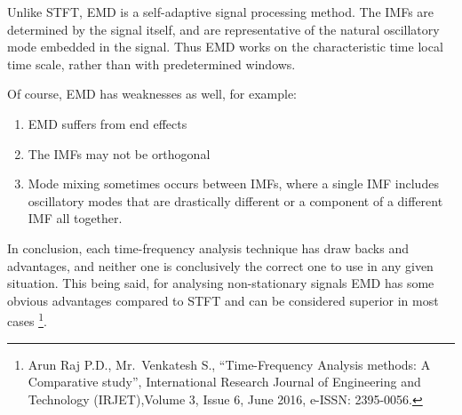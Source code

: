 \documentclass[
  english,
  paper=a4,
  oneside  ,captions=tableheading
]{scrbook}
\providecommand{\tightlist}{%
  \setlength{\itemsep}{0pt}\setlength{\parskip}{0pt}}
\begin{document}
Unlike STFT, EMD is a self-adaptive signal processing method. The IMFs
are determined by the signal itself, and are representative of the
natural oscillatory mode embedded in the signal. Thus EMD works on the
characteristic time local time scale, rather than with predetermined
windows.

Of course, EMD has weaknesses as well, for example:

\begin{enumerate}
\def\labelenumi{\arabic{enumi}.}
\tightlist
\item
  EMD suffers from end effects
\item
  The IMFs may not be orthogonal
\item
  Mode mixing sometimes occurs between IMFs, where a single IMF includes
  oscillatory modes that are drastically different or a component of a
  different IMF all together.
\end{enumerate}

In conclusion, each time-frequency analysis technique has draw backs and
advantages, and neither one is conclusively the correct one to use in
any given situation. This being said, for analysing non-stationary
signals EMD has some obvious advantages compared to STFT and can be
considered superior in most cases \footnote{Arun Raj P.D., Mr.~Venkatesh
  S., ``Time-Frequency Analysis methods: A Comparative study'',
  International Research Journal of Engineering and Technology
  (IRJET),Volume 3, Issue 6, June 2016, e-ISSN: 2395-0056.}.
\end{document}
